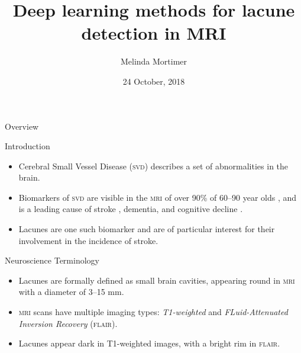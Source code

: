 \documentclass{beamer}
\title{Deep learning methods for lacune detection in MRI}
\author{Melinda Mortimer}
\institute[UNSW] %
{
  Supervisors: Dr Pierre Lafaye de Micheaux and A/Prof. Wei Wen
}
\date{24 October, 2018}
\begin{document}
\begin{frame}
  \titlepage
\end{frame}





\begin{frame}{Overview}
    
\end{frame}

\begin{frame}{Introduction}
    \begin{itemize}
    \item Cerebral Small Vessel Disease (\textsc{svd}) describes a set of abnormalities in the brain.
    \item Biomarkers of \textsc{svd} are visible in the \textsc{mri} of over 90\% of 60--90 year olds \citep{deLeeuwF-E2001Pocw}, and is a leading cause of stroke \citep{WardlawJ.M.2013Nsfr}, dementia, and cognitive decline \citep{NorrvingBo2008Linb}.
    \item Lacunes are one such biomarker and are of particular interest for their involvement in the incidence of stroke.
    \end{itemize}
\end{frame}



\begin{frame}{Neuroscience Terminology}
	\begin{itemize}
	\item Lacunes are formally defined as small brain cavities, appearing round in \textsc{mri} with a diameter of 3--15 mm.
	\item \textsc{mri} scans have multiple imaging types: \textit{T1-weighted} and \textit{FLuid-Attenuated Inversion Recovery} (\textsc{flair}).
	\item Lacunes appear dark in T1-weighted images, with a bright rim in \textsc{flair}.
	\end{itemize}
	
\end{frame}
\end{document}
